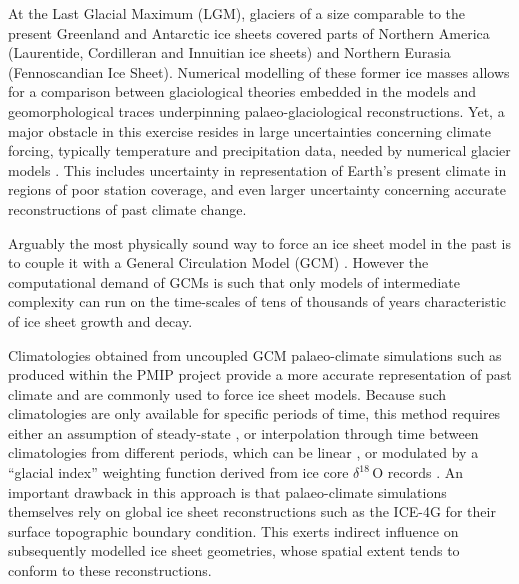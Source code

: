 \introduction
\label{sec:intro}

At the Last Glacial Maximum (LGM), glaciers of a size comparable to the present Greenland and Antarctic ice sheets covered parts of Northern America (Laurentide, Cordilleran and Innuitian ice sheets) and Northern Eurasia (Fennoscandian Ice Sheet). Numerical modelling of these former ice masses allows for a comparison between glaciological theories embedded in the models and geomorphological traces underpinning palaeo-glaciological reconstructions. Yet, a major obstacle in this exercise resides in large uncertainties concerning climate forcing, typically temperature and precipitation data, needed by numerical glacier models \citep{hebeler-etal-2008}. This includes uncertainty in representation of Earth's present climate in regions of poor station coverage, and even larger uncertainty concerning accurate reconstructions of past climate change.

Arguably the most physically sound way to force an ice sheet model in the past is to couple it with a General Circulation Model (GCM) \citep{yoshimori-etal-2001,calov-etal-2002,abeouchi-etal-2007,charbit-etal-2013}. However the computational demand of GCMs is such that only models of intermediate complexity can run on the time-scales of tens of thousands of years characteristic of ice sheet growth and decay.

Climatologies obtained from uncoupled GCM palaeo-climate simulations such as produced within the PMIP project \citep{joussaume-taylor-1995} provide a more accurate representation of past climate and are commonly used to force ice sheet models. Because such climatologies are only available for specific periods of time, this method requires either an assumption of steady-state \citep{huybrechts-tsiobbel-1996}, or interpolation through time between climatologies from different periods, which can be linear \citep{charbit-etal-2002}, or modulated by a ``glacial index'' weighting function derived from ice core $\delta^{18}$\,O records \citep{marshall-clarke-1999,tarasov-peltier-2004,zweck-huybrechts-2005,gregoire-etal-2012}. An important drawback in this approach is that palaeo-climate simulations themselves rely on global ice sheet reconstructions such as the ICE-4G \citep{peltier-1994} for their surface topographic boundary condition. This exerts indirect influence on subsequently modelled ice sheet geometries, whose spatial extent tends to conform to these reconstructions.

